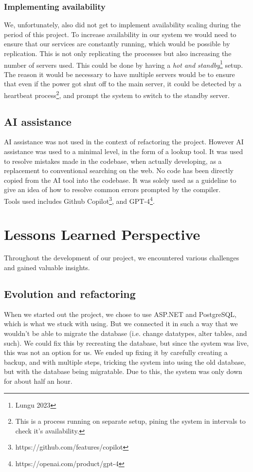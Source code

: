 \documentclass{article}
\begin{document}
\subsubsection{Implementing availability}
We, unfortunately, also did not get to implement availability scaling during the period of this project. To increase availability in our system we would need to ensure that our services are constantly running, which would be possible by replication. This is not only replicating the processes but also increasing the number of servers used. This could be done by having a \textit{hot and standby}\footnote{Lungu 2023} setup. The reason it would be necessary to have multiple servers would be to ensure that even if the power got shut off to the main server, it could be detected by a heartbeat process\footnote{This is a process running on separate setup, pining the system in intervals to check it's availability.}, and prompt the system to switch to the standby server.

\subsection{AI assistance}
AI assistance was not used in the context of refactoring the project. However AI assistance was used to a minimal level, in the form of a lookup tool. It was used to resolve mistakes made in the codebase, when actually developing, as a replacement to conventional searching on the web. No code has been directly copied from the AI tool into the codebase. It was solely used as a guideline to give an idea of how to resolve common errors prompted by the compiler. \\

Tools used includes Github Copilot\footnote{https://github.com/features/copilot}, and GPT-4\footnote{https://openai.com/product/gpt-4}.

\section{Lessons Learned Perspective}
Throughout the development of our project, we encountered various challenges and gained valuable insights.

\subsection{Evolution and refactoring}
\label{evo-refac}
When we started out the project, we chose to use ASP.NET and PostgreSQL, which is what we stuck with using. But we connected it in such a way that we wouldn't be able to migrate the database (i.e. change datatypes, alter tables, and such). We could fix this by recreating the database, but since the system was live, this was not an option for us. We ended up fixing it by carefully creating a backup, and with multiple steps, tricking the system into using the old database, but with the database being migratable. Due to this, the system was only down for about half an hour.\\
\end{document}
